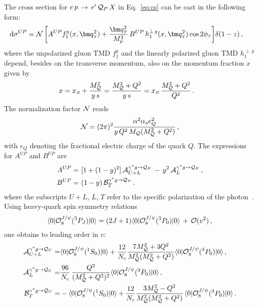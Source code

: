 \documentclass[prd,aps,preprintnumbers,nofootinbib,superscriptaddress]{revtex4}
\newcommand{\xB}{x_{\scriptscriptstyle B}}
\newcommand{\sT}{{\scriptscriptstyle T}}
\renewcommand{\d}{\mathrm{d}}
\begin{document}
The cross section for $e \, p\, \to \, e^\prime\, {\cal Q}_{P}\, X$ in Eq.~\eqref{eq:cs} can be cast in the following form:
\begin{align}
\d\sigma^{UP}
  & =  {{\cal N}}\, \bigg [ A^{UP}  f_1^g (x, \bm q_\sT^2 )+  \frac{\bm q_\sT^2}{M_p^2}\, B^{UP}\, h_1^{\perp\, g} (x, \bm q_\sT^2 ) \cos 2 \phi_\sT  \bigg ] \delta(1-z)\,,
\label{eq:csU}
\end{align}
where the unpolarized gluon TMD $f_1^g$ and the linearly polarized gluon TMD $h_1^{\perp\, g}$ depend, besides on the transverse momentum, also on the momentum fraction $x$ given by
\begin{align}
 x & = \xB + \frac{M^2_{\cal Q}}{y\,s}  = \frac{M^2_{\cal Q} + Q^2}{y\,s} =    \xB\,\frac{M^2_{\cal Q} + Q^2}{Q^2} \, .
 \label{eq:xresult}
\end{align}
The normalization factor $\cal N$ reads
\begin{equation}
{\cal N} =   (2 \pi)^2  \frac{{\alpha^2 \alpha_se_Q^2}}{ y\,  Q^2\, M_{\cal Q}(M_{\cal Q}^2+Q^2)} \,,
\label{eq:N}
\end{equation}
with $e_Q$ denoting the fractional electric charge of the quark $Q$.
The expressions for $A^{UP}$ and $B^{UP}$ are
\begin{align}
{A}^{UP} 
  = &~  [1+(1-y)^2]\,{\cal A}_{U+L}^{\gamma^*g\to {\cal Q}_P}  \, - \,   y^2\, {\cal A}_{L}^{\gamma^*g \to {\cal Q}_P} \,,
\label{eq:AgstarP}  \\
{B}^{UP} =
 &  ~  (1-y)\, {\cal B}_{T}^{\gamma^*g \to {\cal Q}_P}\,.
\end{align} 
where the subscripts $U+L$, $L$, $T$ refer to the specific polarization of the photon~\cite{Pisano:2013cya,Brodkorb:1994de}. 
Using heavy-quark spin symmetry relations~\cite{Bodwin:1994jh}  
\begin{equation}
 \langle 0 \vert {\cal O}_8^{J/\psi} (^3 P_J)\vert 0 \rangle=(2J+1)\langle 0 \vert {\cal O}_8^{J/\psi} (^3 P_0)\vert 0 \rangle\, + \,{{\cal O}(v^2)}\,,
 \label{eq:hqss}
 \end{equation}
one obtains to leading order in $v$:
\begin{align}
{\cal A}_{U+L}^{\gamma^{*}g\to{\cal Q}_{U}}= & \langle0\vert{\cal O}_{8}^{J/\psi}(^{1}S_{0})\vert0\rangle+\frac{12}{N_{c}}\frac{7M_{{\cal Q}}^{2}+3Q^{2}}{M_{{\cal Q}}^{2}(M_{{\cal Q}}^{2}+Q^{2})}\langle0\vert{\cal O}_{8}^{J/\psi}(^{3}P_{0})\vert0\rangle\,,\\
{\cal A}_{L}^{\gamma^{*}g\to{\cal Q}_{U}}= & \frac{96}{N_{c}}\,\frac{Q^{2}}{(M_{{\cal Q}}^{2}+Q^{2})^{2}}\langle0\vert{\cal O}_{8}^{J/\psi}(^{3}P_{0})\vert0\rangle\,,\\
{\cal B}_{T}^{\gamma^{*}g\to{\cal Q}_{U}}= & -\langle0\vert{\cal O}_{8}^{J/\psi}(^{1}S_{0})\vert0\rangle+\frac{12}{N_{c}}\frac{3 M_{{\cal Q}}^{2}-Q^{2}}{M_{{\cal Q}}^{2}(M_{{\cal Q}}^{2}+Q^{2})}\, \langle0\vert{\cal O}_{8}^{J/\psi}(^{3}P_{0})\vert0\rangle\, .
\end{align}
\end{document}
